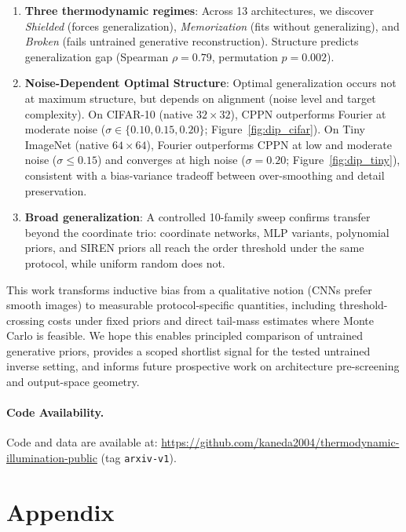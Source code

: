 \documentclass{article}
\begin{document}
\begin{enumerate}
    \item \textbf{Three thermodynamic regimes}: Across 13 architectures, we discover \emph{Shielded} (forces generalization), \emph{Memorization} (fits without generalizing), and \emph{Broken} (fails untrained generative reconstruction). Structure predicts generalization gap (Spearman $\rho = 0.79$, permutation $p = 0.002$).
    \item \textbf{Noise-Dependent Optimal Structure}: Optimal generalization occurs not at maximum structure, but depends on alignment (noise level and target complexity). On CIFAR-10 (native $32\times 32$), CPPN outperforms Fourier at moderate noise ($\sigma \in \{0.10, 0.15, 0.20\}$; Figure~\ref{fig:dip_cifar}). On Tiny ImageNet (native $64\times 64$), Fourier outperforms CPPN at low and moderate noise ($\sigma \leq 0.15$) and converges at high noise ($\sigma=0.20$; Figure~\ref{fig:dip_tiny}), consistent with a bias-variance tradeoff between over-smoothing and detail preservation.
    \item \textbf{Broad generalization}: A controlled 10-family sweep confirms transfer beyond the coordinate trio: coordinate networks, MLP variants, polynomial priors, and SIREN priors all reach the order threshold under the same protocol, while uniform random does not.
\end{enumerate}

This work transforms inductive bias from a qualitative notion (CNNs prefer smooth images) to measurable protocol-specific quantities, including threshold-crossing costs under fixed priors and direct tail-mass estimates where Monte Carlo is feasible. We hope this enables principled comparison of untrained generative priors, provides a scoped shortlist signal for the tested untrained inverse setting, and informs future prospective work on architecture pre-screening and output-space geometry.

\paragraph{Code Availability.}
Code and data are available at:
\href{https://github.com/kaneda2004/thermodynamic-illumination-public}{https://github.com/kaneda2004/thermodynamic-\allowbreak illumination-public} (tag \texttt{arxiv-v1}).










\newpage
\appendix
\section*{Appendix}

\end{document}
